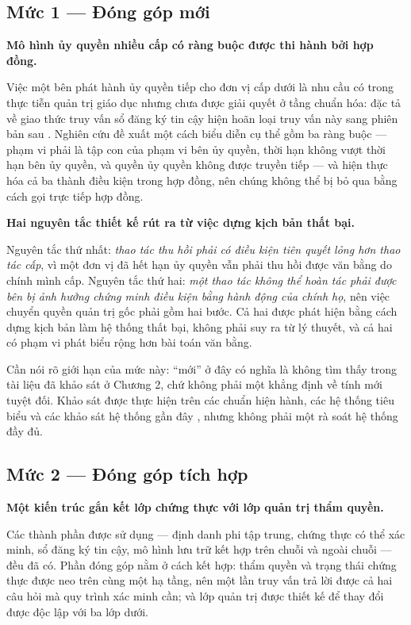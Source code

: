 \subsection{Mức 1 --- Đóng góp mới}

\noindent \textbf{Mô hình ủy quyền nhiều cấp có ràng buộc được thi hành bởi hợp đồng.}

Việc một bên phát hành ủy quyền tiếp cho đơn vị cấp dưới là nhu cầu có trong thực tiễn quản trị giáo dục nhưng chưa được giải quyết ở tầng chuẩn hóa: đặc tả về giao thức truy vấn sổ đăng ký tin cậy hiện hoãn loại truy vấn này sang phiên bản sau \cite{ToIP_TRQP2026}. Nghiên cứu đề xuất một cách biểu diễn cụ thể gồm ba ràng buộc --- phạm vi phải là tập con của phạm vi bên ủy quyền, thời hạn không vượt thời hạn bên ủy quyền, và quyền ủy quyền không được truyền tiếp --- và hiện thực hóa cả ba thành điều kiện trong hợp đồng, nên chúng không thể bị bỏ qua bằng cách gọi trực tiếp hợp đồng.

\noindent \textbf{Hai nguyên tắc thiết kế rút ra từ việc dựng kịch bản thất bại.}

Nguyên tắc thứ nhất: \emph{thao tác thu hồi phải có điều kiện tiên quyết lỏng hơn thao tác cấp}, vì một đơn vị đã hết hạn ủy quyền vẫn phải thu hồi được văn bằng do chính mình cấp. Nguyên tắc thứ hai: \emph{một thao tác không thể hoàn tác phải được bên bị ảnh hưởng chứng minh điều kiện bằng hành động của chính họ}, nên việc chuyển quyền quản trị gốc phải gồm hai bước. Cả hai được phát hiện bằng cách dựng kịch bản làm hệ thống thất bại, không phải suy ra từ lý thuyết, và cả hai có phạm vi phát biểu rộng hơn bài toán văn bằng.

Cần nói rõ giới hạn của mức này: {``}mới{''} ở đây có nghĩa là không tìm thấy trong tài liệu đã khảo sát ở Chương 2, chứ không phải một khẳng định về tính mới tuyệt đối. Khảo sát được thực hiện trên các chuẩn hiện hành, các hệ thống tiêu biểu và các khảo sát hệ thống gần đây \cite{Krul2024, Turco2026, Ambati2026}, nhưng không phải một rà soát hệ thống đầy đủ.

\subsection{Mức 2 --- Đóng góp tích hợp}

\noindent \textbf{Một kiến trúc gắn kết lớp chứng thực với lớp quản trị thẩm quyền.}

Các thành phần được sử dụng --- định danh phi tập trung, chứng thực có thể xác minh, sổ đăng ký tin cậy, mô hình lưu trữ kết hợp trên chuỗi và ngoài chuỗi --- đều đã có. Phần đóng góp nằm ở cách kết hợp: thẩm quyền và trạng thái chứng thực được neo trên cùng một hạ tầng, nên một lần truy vấn trả lời được cả hai câu hỏi mà quy trình xác minh cần; và lớp quản trị được thiết kế để thay đổi được độc lập với ba lớp dưới.

